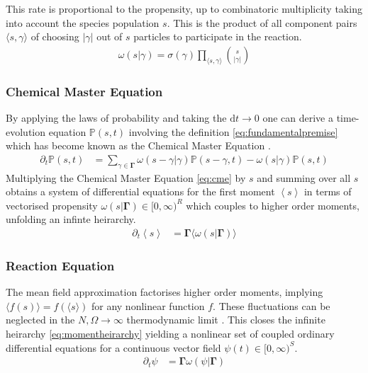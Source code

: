 \documentclass{article}[12pt]
\numberwithin{equation}{section}
\begin{document}
This rate is proportional to the propensity, up to combinatoric multiplicity
taking into account the species population $s$. This is the product of all
component pairs $\langle s,\gamma\rangle$ of choosing $|\gamma|$ out of $s$
particles to participate in the reaction.
\begin{align}
	\omega(s|\gamma)=
	\sigma(\gamma)
		\prod_{\langle s,\gamma\rangle}{s \choose |\gamma|}
	\label{eq:propensity}
\end{align}
\subsubsection{Chemical Master Equation}\vspace{-10pt}
By applying the laws of probability and taking the $\mathrm{d}t\rightarrow 0$
one can derive a time-evolution equation $\mathbb{P}(s,t)$ involving
the definition \eqref{eq:fundamentalpremise} which has become known as the
Chemical Master Equation \cite{Gillespie1992,Gillespie2007}.
\begin{align}
	\partial_t\mathbb{P}(s,t) &=
	\sum_{\gamma\in\mathbf{\Gamma}}
	\omega(s-\gamma|\gamma)\mathbb{P}(s-\gamma,t)-\omega(s|\gamma)\mathbb{P}(s,t)
	\label{eq:cme}
\end{align}
Multiplying the Chemical Master Equation \eqref{eq:cme} by $s$ and summing over all $s$
obtains a system of differential equations for the first moment
$\left\langle s \right\rangle$ in terms of vectorised propensity
$\omega(s|\mathbf{\Gamma})\in[0,\infty)^R$ which couples to higher order moments,
unfolding an infinte heirarchy.
\begin{align}
	\partial_t
	\left\langle s \right\rangle &=
	\mathbf{\Gamma} \big\langle \omega(s|\mathbf{\Gamma}) \big\rangle
	\label{eq:momentheirarchy}
\end{align}\vspace{-50pt}
\subsubsection{Reaction Equation}\vspace{-10pt}
The mean field approximation factorises higher order moments, implying
$\big\langle f(s) \big\rangle=f(\langle s\rangle)$ for any nonlinear
function $f$. These fluctuations can be neglected in the $N,\Omega\rightarrow\infty$
thermodynamic limit \cite{Gillespie2007}. This closes the infinite heirarchy
\eqref{eq:momentheirarchy} yielding a nonlinear set of coupled ordinary
differential equations for a continuous vector field $\psi(t)\in[0,\infty)^S$.
\begin{align}
	\partial_t
	\psi &=
	\mathbf{\Gamma}\omega(\psi|\mathbf{\Gamma})
	\label{eq:reaction}
\end{align}
\pagebreak
\end{document}

